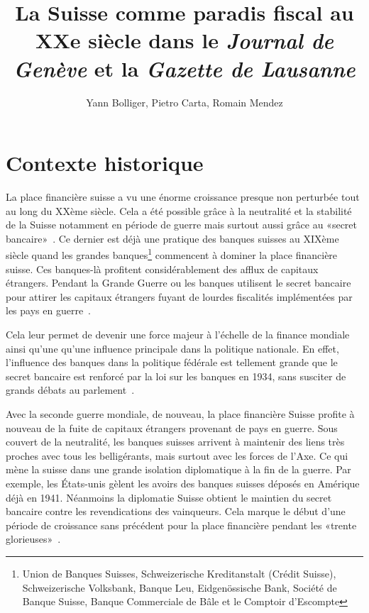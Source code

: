 \documentclass[11pt]{article}
\title{La Suisse comme paradis fiscal au XXe siècle dans le
\textit{Journal de Genève} et la \textit{Gazette de Lausanne}}
\author{Yann Bolliger, Pietro Carta, Romain Mendez}
\begin{document}
\maketitle

\section{Contexte historique}

La place financière suisse a vu une énorme croissance presque non perturbée tout
au long du XXème siècle. Cela a été possible grâce à la neutralité et la
stabilité de la Suisse notamment en période de guerre mais surtout aussi grâce
au «secret bancaire»~\citep[p. 512]{Mazbouri12}. Ce dernier
est déjà une pratique des banques suisses au XIXème siècle quand les grandes
banques\footnote{Union de Banques Suisses, Schweizerische Kreditanstalt (Crédit
Suisse), Schweizerische Volksbank, Banque Leu, Eidgenössische Bank, Société de
Banque Suisse, Banque Commerciale de Bâle et le Comptoir d’Escompte} commencent
à dominer la place financière suisse. Ces banques-là profitent considérablement
des afflux de capitaux étrangers. Pendant la Grande Guerre ou les banques utilisent
le secret bancaire pour attirer les capitaux étrangers fuyant de lourdes
fiscalités implémentées par les pays en guerre~\citep[p. 484-486]{Mazbouri12}.

Cela leur permet de devenir une force majeur à l’échelle de la finance mondiale
ainsi qu’une qu’une influence principale dans la politique nationale. En effet,
l’influence des banques dans la politique fédérale est tellement grande que
le secret bancaire est renforcé par la loi sur les banques en 1934, sans
susciter de grands débats au parlement~\citep{Guex99}. 

Avec la seconde guerre mondiale, de nouveau, la place financière Suisse profite
à nouveau de la fuite de capitaux étrangers provenant de pays en guerre. Sous couvert de la neutralité, les banques suisses arrivent à maintenir des liens très proches
avec tous les belligérants, mais surtout avec les forces de l’Axe. Ce qui mène
la suisse dans une grande isolation diplomatique à la fin de la guerre. Par
exemple, les États-unis gèlent les avoirs des banques suisses déposés en
Amérique déjà en 1941. Néanmoins la diplomatie Suisse obtient le maintien du
secret bancaire contre les revendications des vainqueurs. Cela marque le début
d’une période de croissance sans précédent pour la place financière pendant les
«trente glorieuses»~\citep[p. 495]{Mazbouri12}.
\end{document}
